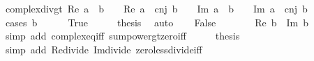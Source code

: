 \begin{isabellebody}
%
\isadelimproof
\isanewline
%
\endisadelimproof
\isanewline
{}\isamarkupfalse%
\ complex{\isacharunderscore}{\kern0pt}div{\isacharunderscore}{\kern0pt}gt{\isacharunderscore}{\kern0pt}{}{\isacharcolon}{\kern0pt}\ {\isachardoublequoteopen}{\isacharparenleft}{\kern0pt}Re\ {\isacharparenleft}{\kern0pt}a\ {\isacharslash}{\kern0pt}\ b{\isacharparenright}{\kern0pt}\ {\isachargreater}{\kern0pt}\ {}\ {\isasymlongleftrightarrow}\ Re\ {\isacharparenleft}{\kern0pt}a\ {\isacharasterisk}{\kern0pt}\ cnj\ b{\isacharparenright}{\kern0pt}\ {\isachargreater}{\kern0pt}\ {}{\isacharparenright}{\kern0pt}\ {\isasymand}\ {\isacharparenleft}{\kern0pt}Im\ {\isacharparenleft}{\kern0pt}a\ {\isacharslash}{\kern0pt}\ b{\isacharparenright}{\kern0pt}\ {\isachargreater}{\kern0pt}\ {}\ {\isasymlongleftrightarrow}\ Im\ {\isacharparenleft}{\kern0pt}a\ {\isacharasterisk}{\kern0pt}\ cnj\ b{\isacharparenright}{\kern0pt}\ {\isachargreater}{\kern0pt}\ {}{\isacharparenright}{\kern0pt}{\isachardoublequoteclose}\isanewline
%
\isadelimproof
%
\endisadelimproof
%
\isatagproof
{}\isamarkupfalse%
\ {\isacharparenleft}{\kern0pt}cases\ {\isachardoublequoteopen}b\ {\isacharequal}{\kern0pt}\ {}{\isachardoublequoteclose}{\isacharparenright}{\kern0pt}\isanewline
\ \ \isamarkupfalse%
\ True\isanewline
\ \ \isamarkupfalse%
\ \isamarkupfalse%
\ {\isacharquery}{\kern0pt}thesis\ \isamarkupfalse%
\ auto\isanewline
{}\isamarkupfalse%
\isanewline
\ \ \isamarkupfalse%
\ False\isanewline
\ \ \isamarkupfalse%
\ \isamarkupfalse%
\ {\isachardoublequoteopen}{}\ {\isacharless}{\kern0pt}\ {\isacharparenleft}{\kern0pt}Re\ b{\isacharparenright}{\kern0pt}\ {\isacharplus}{\kern0pt}\ {\isacharparenleft}{\kern0pt}Im\ b{\isacharparenright}{\kern0pt}\isanewline
\ \ \ \ \isamarkupfalse%
\ {\isacharparenleft}{\kern0pt}simp\ add{\isacharcolon}{\kern0pt}\ complex{\isacharunderscore}{\kern0pt}eq{\isacharunderscore}{\kern0pt}iff\ sum{\isacharunderscore}{\kern0pt}power{}{\isacharunderscore}{\kern0pt}gt{\isacharunderscore}{\kern0pt}zero{\isacharunderscore}{\kern0pt}iff{\isacharparenright}{\kern0pt}\isanewline
\ \ \isamarkupfalse%
\ \isamarkupfalse%
\ {\isacharquery}{\kern0pt}thesis\isanewline
\ \ \ \ \isamarkupfalse%
\ {\isacharparenleft}{\kern0pt}simp\ add{\isacharcolon}{\kern0pt}\ Re{\isacharunderscore}{\kern0pt}divide\ Im{\isacharunderscore}{\kern0pt}divide\ zero{\isacharunderscore}{\kern0pt}less{\isacharunderscore}{\kern0pt}divide{\isacharunderscore}{\kern0pt}iff{\isacharparenright}{\kern0pt}\isanewline

\end{isabellebody}
